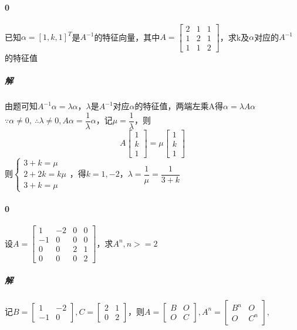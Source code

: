 \paragraph{0}
已知\(\alpha = [1, k, 1]^T\)是\(A^{-1}\)的特征向量，其中\(A = \begin{bmatrix}
    2 & 1 & 1 \\ 
    1 & 2 & 1 \\ 
    1 & 1 & 2
\end{bmatrix}\)，求k及\(\alpha\)对应的\(A^{-1}\)的特征值

\subparagraph{解}
由题可知\(A^{-1}\alpha = \lambda\alpha\)，\(\lambda\)是\(A^{-1}\)对应\(\alpha\)的特征值，两端左乘A得\(\alpha = \lambda A\alpha\)
\(\because \alpha \neq 0,\ \therefore \lambda \neq 0, A\alpha = \dfrac{1}{\lambda}\alpha\)，记\(\mu = \dfrac{1}{\lambda}\)，则
\[A\begin{bmatrix}
    1 \\ 
    k \\ 
    1
\end{bmatrix} = \mu\begin{bmatrix}
    1 \\ 
    k \\ 
    1
\end{bmatrix}\]
则\(\begin{cases}
    3 + k = \mu \\ 
    2 + 2k = k\mu \\ 
    3 + k = \mu
\end{cases}\)，得\(k = 1, -2\)，\(\lambda = \dfrac{1}{\mu} = \dfrac{1}{3 + k}\)

\paragraph{0}
设\(A = \begin{bmatrix}
    1 & -2 & 0 & 0 \\ 
    -1 & 0 & 0 & 0 \\ 
    0 & 0 & 2 & 1 \\ 
    0 & 0 & 0 & 2
\end{bmatrix}\)，求\(A^n, n >= 2\)

\subparagraph{解}
记\(B = \begin{bmatrix}
    1 & -2 \\ 
    -1 & 0
\end{bmatrix}, C = \begin{bmatrix}
    2 & 1 \\ 
    0 & 2
\end{bmatrix}\)，则\(A = \begin{bmatrix}
    B & O \\ 
    O & C
\end{bmatrix}, A^n = \begin{bmatrix}
    B^n & O \\ 
    O & C^n
\end{bmatrix}\),

